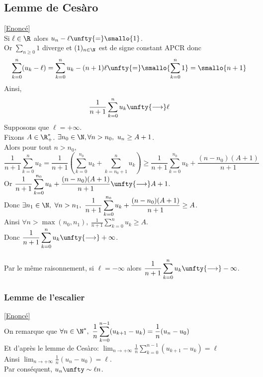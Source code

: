 \documentclass{book}
\begin{document}
	\subsection{Lemme de Cesàro }
	\label{Lemme de Cesàro corrigé}
	\textcolor{blue}{\hyperref[Lemme de Cesàro]{[Enoncé]}}\\
	Si $\ell\in \R$ alors $u_n-\ell\unfty{=}\smallo{1}$.\\
	Or $\displaystyle\sum\limits_{n\geq 0} 1$ diverge et $(1)_{n\in \N}$ est de signe constant APCR donc \[\displaystyle\sum\limits_{k=0}^n(u_k-\ell)=\displaystyle\sum\limits_{k=0}^nu_k-(n+1)\ell\unfty{=} \smallo{\displaystyle\sum\limits_{k=0}^n{1}}=\smallo{n+1}\]
	Ainsi, \[\displaystyle\frac{1}{n+1}\displaystyle\sum\limits_{k=0}^nu_k\unfty{\longrightarrow} \ell\]
	Supposons que $\ell=+\infty$.\\ Fixons $A\in \R_+^*$. $\exists n_0\in \N,\forall n>n_0,\ u_n\geq A+1$.\\
	Alors pour tout $n>n_0$, \[\displaystyle\frac{1}{n+1}\displaystyle\sum\limits_{k=0}^nu_k=\displaystyle\frac{1}{n+1}\left(\displaystyle\sum\limits_{k=0}^{n_0}u_k+\displaystyle\sum\limits_{k=n_0+1}^nu_k\right)\geq \displaystyle\frac{1}{n+1}\displaystyle\sum\limits_{k=0}^{n_0}u_k+\frac{(n-n_0)(A+1)}{n+1}\]
	Or $\displaystyle\frac{1}{n+1}\displaystyle\sum\limits_{k=0}^{n_0}u_k+\frac{(n-n_0)(A+1)}{n+1}\unfty{\longrightarrow} A+1$.\\ Donc $\exists n_1\in \N,\ \forall n>n_1,\ \displaystyle\frac{1}{n+1}\displaystyle\sum\limits_{k=0}^{n_0}u_k+\frac{(n-n_0)(A+1)}{n+1}\geq A$.\\
	Ainsi $\forall n>\max(n_0,n_1),\ \displaystyle\frac{1}{n+1}\displaystyle\sum\limits_{k=0}^nu_k\geq A$.\\ Donc $\displaystyle\frac{1}{n+1}\displaystyle\sum\limits_{k=0}^nu_k\unfty{\longrightarrow}+\infty$.\\\\
	Par le même raisonnement, si $\ell=-\infty$ alors $\displaystyle\frac{1}{n+1}\displaystyle\sum\limits_{k=0}^nu_k\unfty{\longrightarrow}-\infty$.
	
	\subsubsection{Lemme de l'escalier }
	\label{Lemme de l'escalier corrigé}
	\textcolor{blue}{\hyperref[Lemme de l'escalier]{[Enoncé]}}\\
	On remarque que $\forall n\in \N^*,\ \displaystyle\frac{1}{n}\sum_{k=0}^{n-1}(u_{k+1}-u_k)=\frac{1}{n}(u_n-u_0)$
	\\Et d'après le lemme de Cesàro: $\displaystyle\lim_{n\to+\infty}\frac{1}{n}\sum_{k=0}^{n-1}(u_{k+1}-u_k)=\ell$
	\\Ainsi $\displaystyle\lim_{n\to+\infty}\frac{1}{n}(u_n-u_0)=\ell$.
	\\Par conséquent, $u_n\unfty\sim\ell n$.
	
\end{document}
